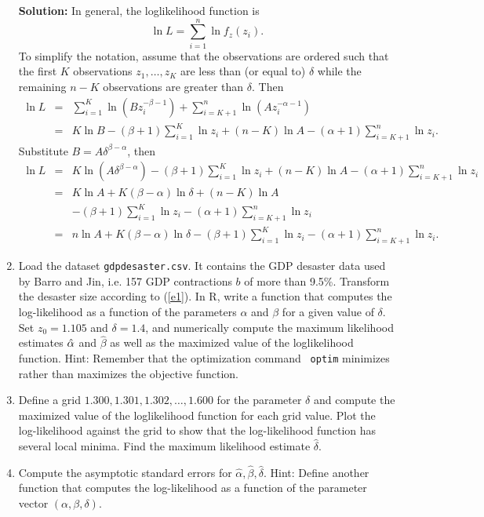 \documentclass{article}
\begin{document}
\begin{enumerate}
\textbf{Solution: }In general, the loglikelihood function is%
\begin{equation*}
\ln L=\sum_{i=1}^{n}\ln f_{z}(z_{i}).
\end{equation*}%
To simplify the notation, assume that the observations are ordered such that
the first $K$ observations $z_{1},\ldots ,z_{K}$ are less than (or equal to) 
$\delta $ while the remaining $n-K$ observations are greater than $\delta $.
Then%
\begin{eqnarray*}
\ln L &=&\sum_{i=1}^{K}\ln \left( Bz_{i}^{-\beta -1}\right)
+\sum_{i=K+1}^{n}\ln \left( Az_{i}^{-\alpha -1}\right)  \\
&=&K\ln B-\left( \beta +1\right) \sum_{i=1}^{K}\ln z_{i}+\left( n-K\right)
\ln A-\left( \alpha +1\right) \sum_{i=K+1}^{n}\ln z_{i}.
\end{eqnarray*}%
Substitute $B=A\delta ^{\beta -\alpha }$, then%
\begin{eqnarray*}
\ln L &=&K\ln \left( A\delta ^{\beta -\alpha }\right) -\left( \beta
+1\right) \sum_{i=1}^{K}\ln z_{i}+\left( n-K\right) \ln A-\left( \alpha
+1\right) \sum_{i=K+1}^{n}\ln z_{i} \\
&=&K\ln A+K\left( \beta -\alpha \right) \ln \delta +\left( n-K\right) \ln A
\\
&&-\left( \beta +1\right) \sum_{i=1}^{K}\ln z_{i}-\left( \alpha +1\right)
\sum_{i=K+1}^{n}\ln z_{i} \\
&=&n\ln A+K\left( \beta -\alpha \right) \ln \delta -\left( \beta +1\right)
\sum_{i=1}^{K}\ln z_{i}-\left( \alpha +1\right) \sum_{i=K+1}^{n}\ln z_{i}.
\end{eqnarray*}

\item Load the dataset \texttt{gdpdesaster.csv}. It contains the GDP
desaster data used by Barro and Jin, i.e. 157 GDP contractions $b$ of more
than 9.5\%. Transform the desaster size according to (\ref{e1}). In R, write
a function that computes the log-likelihood as a function of the parameters $%
\alpha $ and $\beta $ for a given value of $\delta $. Set $z_{0}=1.105$ and $%
\delta =1.4$, and numerically compute the maximum likelihood estimates $\hat{%
\alpha}$ and $\hat{\beta}$ as well as the maximized value of the
loglikelihood function. Hint: Remember that the optimization command \texttt{%
optim} minimizes rather than maximizes the objective function.

\item Define a grid $1.300,1.301,1.302,\ldots ,1.600$ for the parameter $%
\delta $ and compute the maximized value of the loglikelihood function for
each grid value. Plot the log-likelihood against the grid to show that the
log-likelihood function has several local minima. Find the maximum
likelihood estimate $\hat{\delta}$.

\item Compute the asymptotic standard errors for $\hat{\alpha},\hat{\beta},%
\hat{\delta}$. Hint: Define another function that computes the
log-likelihood as a function of the parameter vector $(\alpha ,\beta ,\delta
)$.\newpage 
\end{enumerate}
\end{document}
